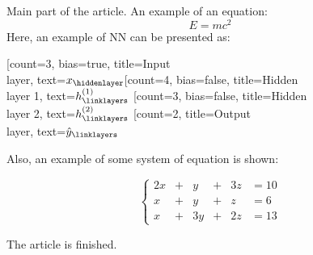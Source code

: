 \documentclass[]{article}
\title{}
\author{}
\begin{document}
\maketitle

\begin{abstract}
Text of this abstract
\end{abstract}
Main part of the article. An example of an equation:
\[E=mc^2\]
Here, an example of NN can be presented as:

\begin{neuralnetwork}[height=4]
	\newcommand{\x}[2]{$x_#2$}
	\newcommand{\y}[2]{$\hat{y}_#2$}
	\newcommand{\hfirst}[2]{\small $h^{(1)}_#2$}
	\newcommand{\hsecond}[2]{\small $h^{(2)}_#2$}
	[count=3, bias=true, title=Input\\layer, text=\x]
	\hiddenlayer[count=4, bias=false, title=Hidden\\layer 1, text=\hfirst] \linklayers
	\hiddenlayer[count=3, bias=false, title=Hidden\\layer 2, text=\hsecond] \linklayers
	\outputlayer[count=2, title=Output\\layer, text=\y] \linklayers
\end{neuralnetwork}

Also, an example of some system of equation is shown:

\begin{equation*}
	\left\{
	\begin{alignedat}{3}
		2x & +{} &  y & +{} & 3z & = 10 \\
		x & +{} &  y & +{} &  z & = 6 \\
		x & +{} & 3y & +{} & 2z & = 13
	\end{alignedat}
	\right.
\end{equation*}

The article is finished.
\end{document}

